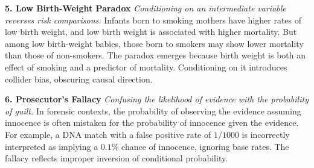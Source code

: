 \begin{tcolorbox}[
  colback=gray!2,
  colframe=gray!60,
  boxrule=0.4pt,
  width=\textwidth,
  arc=1pt,
  left=8pt,
  right=8pt,
  top=6pt,
  bottom=6pt,
  shadow={0mm}{-0.5mm}{0mm}{gray!30}
]
\vspace{1em}

\textbf{5. Low Birth-Weight Paradox}  
\emph{Conditioning on an intermediate variable reverses risk comparisons.}  
Infants born to smoking mothers have higher rates of low birth weight, and low birth weight is associated with higher mortality. But among low birth-weight babies, those born to smokers may show lower mortality than those of non-smokers. The paradox emerges because birth weight is both an effect of smoking and a predictor of mortality. Conditioning on it introduces collider bias, obscuring causal direction.

\vspace{1em}

\textbf{6. Prosecutor’s Fallacy}  
\emph{Confusing the likelihood of evidence with the probability of guilt.}  
In forensic contexts, the probability of observing the evidence assuming innocence is often mistaken for the probability of innocence given the evidence. For example, a DNA match with a false positive rate of $1/1000$ is incorrectly interpreted as implying a $0.1\%$ chance of innocence, ignoring base rates. The fallacy reflects improper inversion of conditional probability.

\end{tcolorbox}

